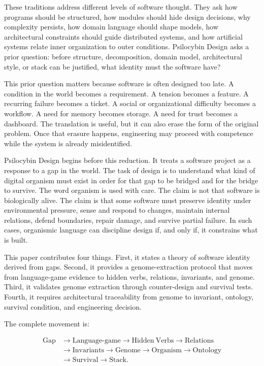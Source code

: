 \documentclass[11pt]{article}
\begin{document}
These traditions address different levels of software thought. They ask how programs should be structured, how modules should hide design decisions, why complexity persists, how domain language should shape models, how architectural constraints should guide distributed systems, and how artificial systems relate inner organization to outer conditions. Psilocybin Design asks a prior question: before structure, decomposition, domain model, architectural style, or stack can be justified, what identity must the software have?

This prior question matters because software is often designed too late. A condition in the world becomes a requirement. A tension becomes a feature. A recurring failure becomes a ticket. A social or organizational difficulty becomes a workflow. A need for memory becomes storage. A need for trust becomes a dashboard. The translation is useful, but it can also erase the form of the original problem. Once that erasure happens, engineering may proceed with competence while the system is already misidentified.

Psilocybin Design begins before this reduction. It treats a software project as a response to a gap in the world. The task of design is to understand what kind of digital organism must exist in order for that gap to be bridged and for the bridge to survive. The word organism is used with care. The claim is not that software is biologically alive. The claim is that some software must preserve identity under environmental pressure, sense and respond to changes, maintain internal relations, defend boundaries, repair damage, and survive partial failure. In such cases, organismic language can discipline design if, and only if, it constrains what is built.

This paper contributes four things. First, it states a theory of software identity derived from gaps. Second, it provides a genome-extraction protocol that moves from language-game evidence to hidden verbs, relations, invariants, and genome. Third, it validates genome extraction through counter-design and survival tests. Fourth, it requires architectural traceability from genome to invariant, ontology, survival condition, and engineering decision.

The complete movement is:

\[
\begin{aligned}
    \mathrm{Gap} &\rightarrow \mathrm{Language\mbox{-}game} \rightarrow \mathrm{Hidden\ Verbs} \rightarrow \mathrm{Relations} \\
                 &\rightarrow \mathrm{Invariants} \rightarrow \mathrm{Genome} \rightarrow \mathrm{Organism} \rightarrow \mathrm{Ontology} \\
                 &\rightarrow \mathrm{Survival} \rightarrow \mathrm{Stack}.
\end{aligned}
\]
\end{document}
